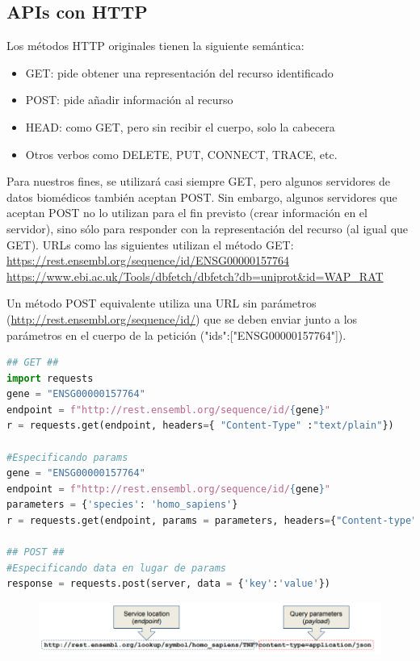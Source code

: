\subsection{APIs con HTTP}
Los métodos HTTP originales tienen la siguiente semántica:
\begin{itemize}
\item GET: pide obtener una representación del recurso identificado
\item POST: pide añadir información al recurso
\item HEAD: como GET, pero sin recibir el cuerpo, solo la cabecera
\item Otros verbos como DELETE, PUT, CONNECT, TRACE, etc.
\end{itemize}

Para nuestros fines, se utilizará casi siempre GET, pero algunos servidores de datos biomédicos también aceptan POST. Sin embargo, algunos servidores que aceptan POST no lo utilizan para el fin previsto (crear información en el servidor), sino sólo para responder con la representación del recurso (al igual que GET).
URLs como las siguientes utilizan el método GET: \\
\href{https://rest.ensembl.org/sequence/id/ENSG00000157764}{https://rest.ensembl.org/sequence/id/ENSG00000157764} \\
\href{https://www.ebi.ac.uk/Tools/dbfetch/dbfetch?db=uniprot\&id=WAP\_RAT}{https://www.ebi.ac.uk/Tools/dbfetch/dbfetch?db=uniprot\&id=WAP\_RAT}

Un método POST equivalente utiliza una URL sin parámetros (\href{http://rest.ensembl.org/sequence/id/}{http://rest.ensembl.org/sequence/id/}) que se deben enviar junto a los parámetros en el cuerpo de la petición ({"ids":["ENSG00000157764"]}).
\begin{lstlisting}[language=Python]
## GET ##
import requests
gene = "ENSG00000157764"
endpoint = f"http://rest.ensembl.org/sequence/id/{gene}"
r = requests.get(endpoint, headers={ "Content-Type" :"text/plain"})

#Especificando params
gene = "ENSG00000157764"
endpoint = f"http://rest.ensembl.org/sequence/id/{gene}"
parameters = {'species': 'homo_sapiens'}
r = requests.get(endpoint, params = parameters, headers={"Content-type" : "text/json"})

## POST ##
#Especificando data en lugar de params
response = requests.post(server, data = {'key':'value'})
\end{lstlisting}

\begin{figure}[htbp]
\centering
\includegraphics[width = \textwidth]{figs/rest-request.png}
\end{figure}

